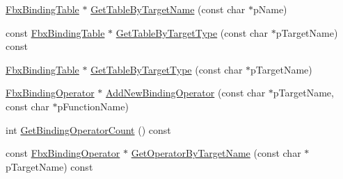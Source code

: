 \begin{DoxyCompactItemize}
\item 
\hyperlink{class_fbx_binding_table}{Fbx\+Binding\+Table} $\ast$ \hyperlink{class_fbx_implementation_af50ff5315cb37e8e8ac0f8fb2b145e2e}{Get\+Table\+By\+Target\+Name} (const char $\ast$p\+Name)
\item 
const \hyperlink{class_fbx_binding_table}{Fbx\+Binding\+Table} $\ast$ \hyperlink{class_fbx_implementation_a9a8f103f0b874ff491c7f31b8b8555b4}{Get\+Table\+By\+Target\+Type} (const char $\ast$p\+Target\+Name) const
\item 
\hyperlink{class_fbx_binding_table}{Fbx\+Binding\+Table} $\ast$ \hyperlink{class_fbx_implementation_af8fa4603b3a3226997504f4ca518f1c4}{Get\+Table\+By\+Target\+Type} (const char $\ast$p\+Target\+Name)
\item 
\hyperlink{class_fbx_binding_operator}{Fbx\+Binding\+Operator} $\ast$ \hyperlink{class_fbx_implementation_abc8cd44b869458fd075729c26efcafd9}{Add\+New\+Binding\+Operator} (const char $\ast$p\+Target\+Name, const char $\ast$p\+Function\+Name)
\item 
int \hyperlink{class_fbx_implementation_aa84f7f2dc9fa201ce6e3cc230bb327e0}{Get\+Binding\+Operator\+Count} () const
\item 
const \hyperlink{class_fbx_binding_operator}{Fbx\+Binding\+Operator} $\ast$ \hyperlink{class_fbx_implementation_aa38e6cb27a349e77f3137e2f09c9ffde}{Get\+Operator\+By\+Target\+Name} (const char $\ast$p\+Target\+Name) const
\end{DoxyCompactItemize}
